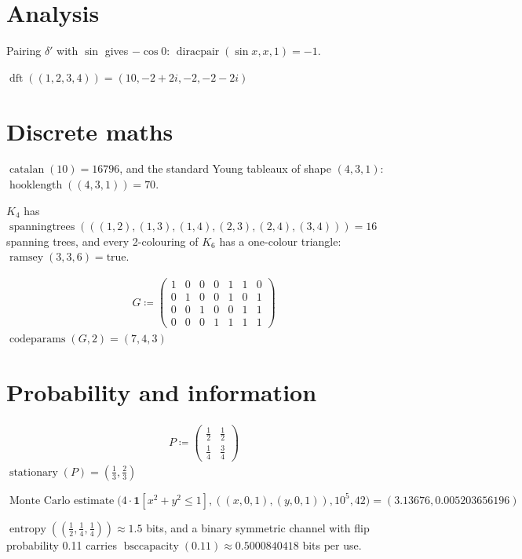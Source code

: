 \documentclass[11pt,a4paper]{article}
\theoremstyle{plain}
\theoremstyle{definition}
\theoremstyle{remark}
\begin{document}
\section*{Analysis}

Pairing $\delta'$ with $\sin$ gives $-\cos 0$: $\operatorname{diracpair}(\sin x, x, 1) = -1$.

$\operatorname{dft}((1, 2, 3, 4)) = \left(10, -2 + 2 i, -2, -2 - 2 i\right)$

\section*{Discrete maths}

$\operatorname{catalan}(10) = 16796$, and the standard Young tableaux of shape $(4, 3, 1)$: $\operatorname{hooklength}((4, 3, 1)) = 70$.

$K_4$ has $\operatorname{spanningtrees}(((1,2), (1,3), (1,4), (2,3), (2,4), (3,4))) = 16$ spanning trees, and every 2-colouring of $K_6$ has a one-colour triangle: $\operatorname{ramsey}(3, 3, 6) = \text{true}$.

\begin{align*}
  G \coloneqq  \begin{pmatrix} 1 & 0 & 0 & 0 & 1 & 1 & 0 \\ 0 & 1 & 0 & 0 & 1 & 0 & 1 \\ 0 & 0 & 1 & 0 & 0 & 1 & 1 \\ 0 & 0 & 0 & 1 & 1 & 1 & 1 \end{pmatrix}
\end{align*}
$\operatorname{codeparams}(G, 2) = \left(7, 4, 3\right)$

\section*{Probability and information}

\begin{align*}
  P \coloneqq  \begin{pmatrix} \tfrac12 & \tfrac12 \\ \tfrac14 & \tfrac34 \end{pmatrix}
\end{align*}
$\operatorname{stationary}(P) = \left(\frac{1}{3}, \frac{2}{3}\right)$

$\operatorname{Monte\ Carlo\ estimate}\big(4 \cdot \mathbf 1[x^2 + y^2 \le 1], ((x, 0, 1), (y, 0, 1)), 10^5, 42\big) = \left(3.13676, 0.005203656196\right)$

$\operatorname{entropy}((\tfrac12, \tfrac14, \tfrac14)) \approx 1.5$ bits, and a binary symmetric channel with flip probability 0.11 carries $\operatorname{bsccapacity}(0.11) \approx 0.5000840418$ bits per use.
\end{document}
